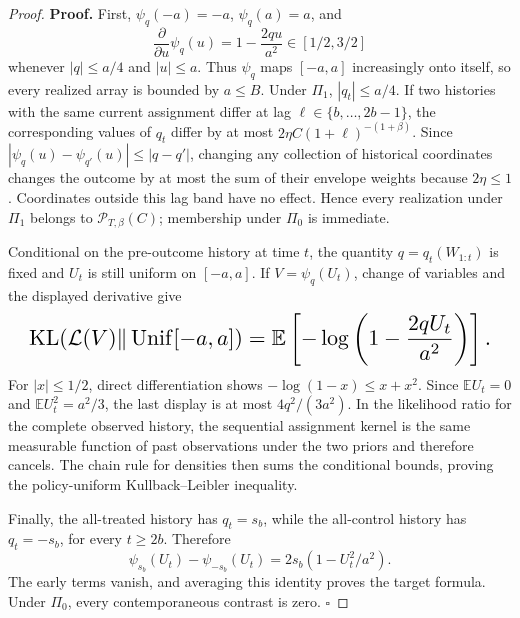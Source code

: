 \documentclass{article}
\begin{document}
\begin{proof}
\textbf{Proof.} First, \(\psi_q(-a)=-a\), \(\psi_q(a)=a\), and \[\frac{\partial}{\partial u}\psi_q(u)=1-\frac{2qu}{a^2}\in[1/2,3/2]\] whenever \(|q|\le a/4\) and \(|u|\le a\). Thus \(\psi_q\) maps \([-a,a]\) increasingly onto itself, so every realized array is bounded by \(a\le B\). Under \(\Pi_1\), \(|q_t|\le a/4\). If two histories with the same current assignment differ at lag \(\ell\in\{b,\ldots,2b-1\}\), the corresponding values of \(q_t\) differ by at most \(2\eta C(1+\ell)^{-(1+\beta)}\). Since \(|\psi_q(u)-\psi_{q'}(u)|\le|q-q'|\), changing any collection of historical coordinates changes the outcome by at most the sum of their envelope weights because \(2\eta\le1\). Coordinates outside this lag band have no effect. Hence every realization under \(\Pi_1\) belongs to \(\mathcal P_{T,\beta}(C)\); membership under \(\Pi_0\) is immediate.

Conditional on the pre-outcome history at time \(t\), the quantity \(q=q_t(W_{1:t})\) is fixed and \(U_t\) is still uniform on \([-a,a]\). If \(V=\psi_q(U_t)\), change of variables and the displayed derivative give \[
\makebox[\linewidth][c]{\resizebox{0.98\linewidth}{!}{\leavevmode\par\noindent \makebox[\linewidth][c]{\resizebox{0.98\linewidth}{!}{\(\displaystyle \displaystyle \operatorname{KL}(\mathcal L(V)\Vert\operatorname{Unif}[-a,a])=\mathbb E\left[-\log\left(1-\frac{2qU_t}{a^2}\right)\right].\)}}\par\noindent}}
\] For \(|x|\le1/2\), direct differentiation shows \(-\log(1-x)\le x+x^2\). Since \(\mathbb E U_t=0\) and \(\mathbb E U_t^2=a^2/3\), the last display is at most \(4q^2/(3a^2)\). In the likelihood ratio for the complete observed history, the sequential assignment kernel is the same measurable function of past observations under the two priors and therefore cancels. The chain rule for densities then sums the conditional bounds, proving the policy-uniform Kullback--Leibler inequality.

Finally, the all-treated history has \(q_t=s_b\), while the all-control history has \(q_t=-s_b\), for every \(t\ge2b\). Therefore \[\psi_{s_b}(U_t)-\psi_{-s_b}(U_t)=2s_b(1-U_t^2/a^2).\] The early terms vanish, and averaging this identity proves the target formula. Under \(\Pi_0\), every contemporaneous contrast is zero. \(\square\)
\end{proof}
\end{document}
